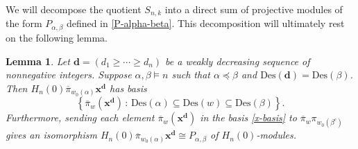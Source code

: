 \documentclass[10pt]{amsart}
\newtheorem{lemma}[theorem]{Lemma}
\theoremstyle{definition}
\newcommand{\Des}{{\mathrm {Des}}}
\newcommand{\xx}{{\mathbf {x}}}
\newcommand{\dd}{{\mathbf {d}}}
\newcommand{\pib}{\overline{\pi}}
\begin{document}
We will decompose the quotient $S_{n,k}$ into a direct sum of projective modules of the form $P_{\alpha,\beta}$ defined in \eqref{P-alpha-beta}.
This decomposition will ultimately rest on the following lemma.

\begin{lemma}
\label{alpha-beta-monomial}
Let $\dd = (d_1 \geq \cdots \geq d_n)$ be a weakly decreasing sequence of nonnegative integers.
Suppose $\alpha,\beta \models n$ such that $\alpha\preceq\beta$ and $\Des(\dd) = \Des(\beta)$.
Then $H_n(0) \pib_{w_0(\alpha)} \xx^{\dd}$ has basis
\begin{equation}
\label{x-basis}
\left\{ \pib_w(\xx^{\dd}) \,:\, \Des(\alpha) \subseteq \Des(w) \subseteq \Des(\beta) \right\}.
\end{equation}
Furthermore, sending each element $\pib_w(\xx^\dd)$ in the basis \eqref{x-basis} to $\pib_w\pi_{w_0(\beta^c)}$ gives an isomorphism $H_n(0) \pib_{w_0(\alpha)} \xx^{\dd} \cong P_{\alpha,\beta}$ of $H_n(0)$-modules.
\end{lemma}
\end{document}

